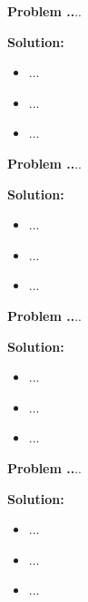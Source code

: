 \documentclass{article}
\theoremstyle{problemstyle}
\newenvironment{boxedproblem}[1]
{\begin{tcolorbox}[colback=white, colframe=black, boxrule=0.5pt]\noindent\textbf{Problem #1.}}
{\end{tcolorbox}}
\begin{document}

\begin{boxedproblem}{8}
...
\end{boxedproblem}

\textbf{Solution:}
\begin{itemize}[label={},leftmargin=1.25cm,nosep]
    \item ...
    \item ...
    \item ...
\end{itemize}


\begin{boxedproblem}{9}
...
\end{boxedproblem}

\textbf{Solution:}
\begin{itemize}[label={},leftmargin=1.25cm,nosep]
    \item ...
    \item ...
    \item ...
\end{itemize}


\begin{boxedproblem}{10}
...
\end{boxedproblem}

\textbf{Solution:}
\begin{itemize}[label={},leftmargin=1.25cm,nosep]
    \item ...
    \item ...
    \item ...
\end{itemize}


\begin{boxedproblem}{11}
    ...
    \end{boxedproblem}
    
    \textbf{Solution:}
    \begin{itemize}[label={},leftmargin=1.25cm,nosep]
        \item ...
        \item ...
        \item ...
    \end{itemize}
    
\end{document}
